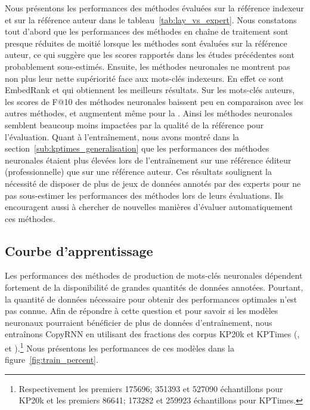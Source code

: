 Nous présentons les performances des méthodes évaluées sur la référence indexeur et sur la référence auteur dans le tableau~\ref{tab:lay_vs_expert}.
Nous constatons tout d'abord que les performances des méthodes en chaîne de traitement sont presque réduites de moitié lorsque les méthodes sont évaluées sur la référence auteur, ce qui suggère que les scores rapportés dans les études précédentes sont probablement sous-estimés.
Ensuite, les méthodes neuronales ne montrent pas non plus leur nette supériorité face aux mots-clés indexeurs. En effet ce sont EmbedRank et \tfidf{} qui obtiennent les meilleurs résultats.
Sur les mots-clés auteurs, les scores de F@10 des méthodes neuronales baissent peu en comparaison avec les autres méthodes, et augmentent même pour la \map{}.
Ainsi les méthodes neuronales semblent beaucoup moins impactées par la qualité de la référence pour l'évaluation.
Quant à l'entraînement, nous avons montré dans la section~\ref{sub:kptimes_generalisation} que les performances des méthodes neuronales étaient plus élevées lors de l'entraînement sur une référence éditeur (professionnelle) que sur une référence auteur. 
Ces résultats soulignent la nécessité de disposer de plus de jeux de données annotés par des experts pour ne pas sous-estimer les performances des méthodes lors de leurs évaluations.
Ils encouragent aussi à chercher de nouvelles manières d'évaluer automatiquement ces méthodes.

\subsection{Courbe d'apprentissage}

Les performances des méthodes de production de mots-clés neuronales dépendent fortement de la disponibilité de grandes quantités de données annotées.
Pourtant, la quantité de données nécessaire pour obtenir des performances optimales n'est pas connue.
Afin de répondre à cette question et pour savoir si les modèles neuronaux pourraient bénéficier de plus de données d'entraînement, nous entraînons CopyRNN en utilisant des fractions des corpus KP20k et KPTimes (,  et ).\footnote{Respectivement les premiers \num{175696}; \num{351393} et \num{527090} échantillons pour KP20k et les premiers \num{86641}; \num{173282} et \num{259923} échantillons pour KPTimes.}
Nous présentons les performances de ces modèles dans la figure~\ref{fig:train_percent}.



